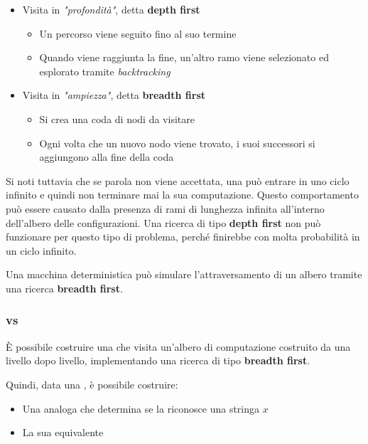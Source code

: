 \documentclass[italian, 10pt]{article}
\begin{document}
\begin{itemize}
  \item Visita in \textit{"profondità"}, detta \textbf{depth first}
        \begin{itemize}
          \item Un percorso viene seguito fino al suo termine
          \item Quando viene raggiunta la fine, un'altro ramo viene selezionato ed esplorato tramite \textit{backtracking}
        \end{itemize}
  \item Visita in \textit{"ampiezza"}, detta \textbf{breadth first}
        \begin{itemize}
          \item Si crea una coda di nodi da visitare
          \item Ogni volta che un nuovo nodo viene trovato, i suoi successori si aggiungono alla fine della coda
        \end{itemize}
\end{itemize}

Si noti tuttavia che se parola non viene accettata, una \TM può entrare in uno ciclo infinito e quindi non terminare mai la sua computazione.
Questo comportamento può essere causato dalla presenza di rami di lunghezza infinita all'interno dell'albero delle configurazioni.
Una ricerca di tipo \textbf{depth first} non può funzionare per questo tipo di problema, perché finirebbe con molta probabilità in un ciclo infinito.

Una macchina deterministica può simulare l'attraversamento di un albero tramite una ricerca \textbf{breadth first}.

\subsubsection{\DTM vs \NTM}

È possibile costruire una \DTM che visita un'albero di computazione costruito da una \NTM livello dopo livello, implementando una ricerca di tipo \textbf{breadth first}.

Quindi, data una \NTM, è possibile costruire:

\begin{itemize}
  \item Una \DTM analoga che determina se la \NTM riconosce una stringa \(x\)
  \item La sua equivalente \DTM
\end{itemize}
\end{document}
